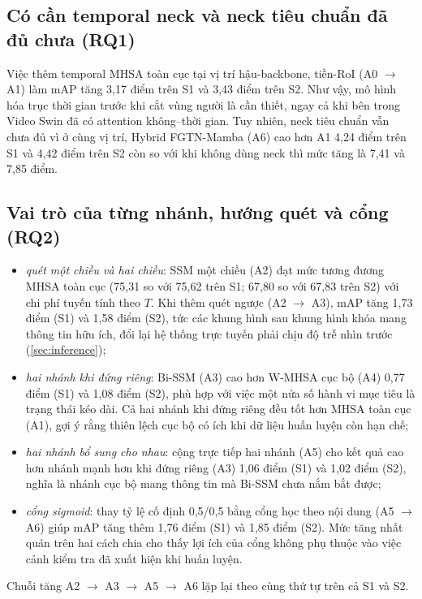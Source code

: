 \subsection{Có cần temporal neck và neck tiêu chuẩn đã đủ chưa (RQ1)}

Việc thêm temporal MHSA toàn cục tại vị trí hậu-backbone, tiền-RoI (A0 $\rightarrow$ A1) làm mAP tăng 3,17 điểm trên S1 và 3,43 điểm trên S2. Như vậy, mô hình hóa trục thời gian trước khi cắt vùng người là cần thiết, ngay cả khi bên trong Video Swin đã có attention không--thời gian. Tuy nhiên, neck tiêu chuẩn vẫn chưa đủ vì ở cùng vị trí, Hybrid FGTN-Mamba (A6) cao hơn A1 4,24 điểm trên S1 và 4,42 điểm trên S2 còn so với khi không dùng neck thì mức tăng là 7,41 và 7,85 điểm.

\subsection{Vai trò của từng nhánh, hướng quét và cổng (RQ2)}

\begin{itemize}
  \item \emph{quét một chiều và hai chiều}: SSM một chiều (A2) đạt mức tương đương MHSA toàn cục (75,31 so với 75,62 trên S1; 67,80 so với 67,83 trên S2) với chi phí tuyến tính theo $T$. Khi thêm quét ngược (A2 $\rightarrow$ A3), mAP tăng 1,73 điểm (S1) và 1,58 điểm (S2), tức các khung hình sau khung hình khóa mang thông tin hữu ích, đổi lại hệ thống trực tuyến phải chịu độ trễ nhìn trước (\cref{sec:inference});
  \item \emph{hai nhánh khi đứng riêng}: Bi-SSM (A3) cao hơn W-MHSA cục bộ (A4) 0,77 điểm (S1) và 1,08 điểm (S2), phù hợp với việc một nửa số hành vi mục tiêu là trạng thái kéo dài. Cả hai nhánh khi đứng riêng đều tốt hơn MHSA toàn cục (A1), gợi ý rằng thiên lệch cục bộ có ích khi dữ liệu huấn luyện còn hạn chế;
  \item \emph{hai nhánh bổ sung cho nhau}: cộng trực tiếp hai nhánh (A5) cho kết quả cao hơn nhánh mạnh hơn khi đứng riêng (A3) 1,06 điểm (S1) và 1,02 điểm (S2), nghĩa là nhánh cục bộ mang thông tin mà Bi-SSM chưa nắm bắt được;
  \item \emph{cổng sigmoid}: thay tỷ lệ cố định 0,5/0,5 bằng cổng học theo nội dung (A5 $\rightarrow$ A6) giúp mAP tăng thêm 1,76 điểm (S1) và 1,85 điểm (S2). Mức tăng nhất quán trên hai cách chia cho thấy lợi ích của cổng không phụ thuộc vào việc cảnh kiểm tra đã xuất hiện khi huấn luyện.
\end{itemize}
Chuỗi tăng A2 $\rightarrow$ A3 $\rightarrow$ A5 $\rightarrow$ A6 lặp lại theo cùng thứ tự trên cả S1 và S2.


